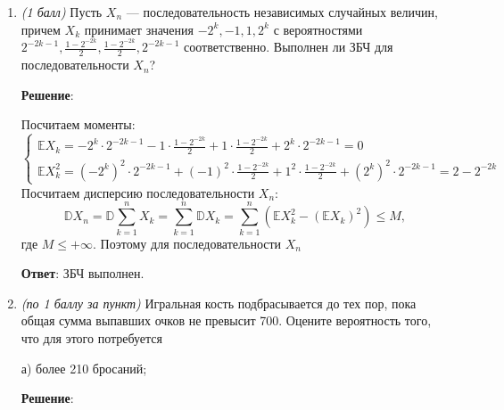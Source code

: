 \documentclass{article}
\begin{document}
\begin{enumerate}
\item \textit{(1 балл)} Пусть ${X_n}$ — последовательность независимых случайных величин, причем $X_k$ принимает значения $-2^k, -1, 1, 2^k$ с вероятностями $2^{-2k-1},\frac{1-2^{-2k}}{2},\frac{1-2^{-2k}}{2}, 2^{-2k-1}$ соответственно. Выполнен ли ЗБЧ для последовательности ${X_n}$?

\textbf{Решение}:

Посчитаем моменты:
\begin{equation}
  \begin{cases}
    \mathbb{E}X_k = -2^k \cdot 2^{-2k-1} -1 \cdot \frac{1-2^{-2k}}{2} + 1 \cdot \frac{1-2^{-2k}}{2} + 2^k \cdot 2^{-2k-1} = 0 \\
    \mathbb{E}X_k^2 = (-2^k)^2 \cdot 2^{-2k-1} + (-1)^2 \cdot \frac{1-2^{-2k}}{2} + 1^2 \cdot \frac{1-2^{-2k}}{2} + (2^k)^2 \cdot 2^{-2k-1} = 2 - 2^{-2k}
  \end{cases}
\end{equation}
Посчитаем дисперсию последовательности ${X_n}$:
\begin{equation}
  \mathbb{D}X_n = \mathbb{D}\sum_{k=1}^{n}X_k = \sum_{k=1}^{n}\mathbb{D}X_k = \sum_{k=1}^{n}(\mathbb{E}X_k^2 - (\mathbb{E}X_k)^2) \leq M,
\end{equation}
где $M \leq +\infty$. Поэтому для последовательности $X_n$

\textbf{Ответ}:
ЗБЧ выполнен.

\item \textit{(по 1 баллу за пункт)} Игральная кость подбрасывается до тех пор, пока общая сумма выпавших очков не превысит 700. Оцените вероятность того, что для этого потребуется 

а) более 210 бросаний;

\textbf{Решение}:


\end{enumerate}
\end{document}
